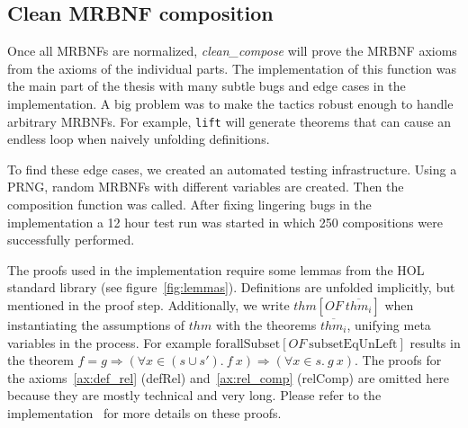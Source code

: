 \subsection{Clean \acs{MRBNF} composition}\label{sec:clean_compose}

\newcommand{\OF}[2]{\ensuremath{#1[\textit{OF} \: #2]}}

Once all \acp{MRBNF} are normalized, \textit{clean\_compose} will prove the \ac{MRBNF} axioms from the axioms of the individual parts. The implementation of this function was the main part of the thesis with many subtle bugs and edge cases in the implementation. A big problem was to make the tactics robust enough to handle arbitrary \acp{MRBNF}. For example, \texttt{lift} will generate theorems that can cause an endless loop when naively unfolding definitions.

To find these edge cases, we created an automated testing infrastructure. Using a \ac{PRNG}, random \acp{MRBNF} with different variables are created. Then the composition function was called. After fixing lingering bugs in the implementation a 12 hour test run was started in which 250 compositions were successfully performed.

The proofs used in the implementation require some lemmas from the \ac{HOL} standard library (see figure~\ref{fig:lemmas}). Definitions are unfolded implicitly, but mentioned in the proof step. Additionally, we write $\OF{thm}{\overline{thm_i}}$ when instantiating the assumptions of $thm$ with the theorems $\overline{thm_i}$, unifying meta variables in the process. For example $\OF{\text{forallSubset}}{\text{subsetEqUnLeft}}$ results in the theorem $f = g \Longrightarrow (\forall x \in (s \cup s'). \: f \: x) \Longrightarrow (\forall x \in s. \: g \: x)$. The proofs for the axioms~\ref{ax:def_rel} (defRel) and~\ref{ax:rel_comp} (relComp) are omitted here because they are mostly technical and very long. Please refer to the implementation~\cite{implementation} for more details on these proofs.


